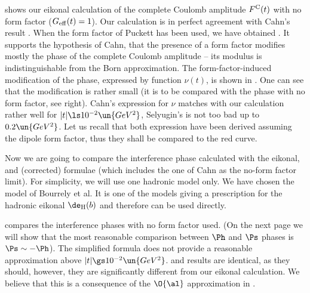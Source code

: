  shows our eikonal calculation of the complete Coulomb amplitude $F^{\rm C}(t)$ with no form factor ($G_{\rm eff}(t) = 1$). Our calculation is in perfect agreement with Cahn's result . When the form factor of Puckett has been used, we have obtained . It supports the hypothesis of Cahn, that the presence of a form factor modifies mostly the phase of the complete Coulomb amplitude -- its modulus is indistinguishable from the Born approximation. The form-factor-induced modification of the phase, expressed by function $\nu(t)$, is shown in . One can see that the modification is rather small (it is to be compared with the phase with no form factor, see  right). Cahn's expression for $\nu$ matches with our calculation rather well for $|t| \ls 10^{-2}\un{GeV^2}$, Selyugin's is not too bad up to $0.2\un{GeV^2}$. Let us recall that both expression have been derived assuming the dipole form factor, thus they shall be compared to the red curve.


\bmfig
{}
%
\emfig

Now we are going to compare the interference phase calculated with the eikonal, \WY{} and (corrected) \KL{} formulae (which includes the one of Cahn as the no-form factor limit). For simplicity, we will use one hadronic model only. We have chosen the model of Bourrely et al. It is one of the models giving a prescription for the hadronic eikonal $\de_{\rm H}(b)$ and therefore  can be used directly.

 compares the interference phases with no form factor used. (On the next page we will show that the most reasonable comparison between $\Ph$ and $\Ps$ phases is $\Ps \sim - \Ph$). The simplified \WY{} formula does not provide a reasonable approximation above $|t| \gs 10^{-2}\un{GeV^2}$. \WY{} and \KL{} results are identical, as they should, however, they are significantly different from our eikonal calculation. We believe that this is a consequence of the $\O{\al}$ approximation in .

